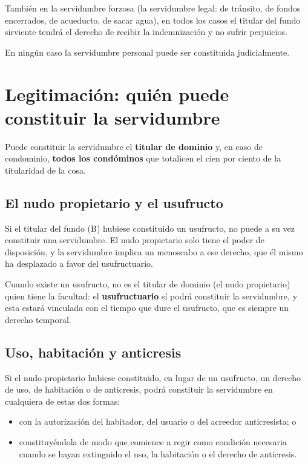 \documentclass[12pt,oneside]{book}
\begin{document}
También en la servidumbre forzosa (la servidumbre legal: de tránsito, de fondos encerrados, de acueducto, de sacar agua), en todos los casos el titular del fundo sirviente tendrá el derecho de recibir la indemnización y no sufrir perjuicios.

\begin{important}
En ningún caso la servidumbre personal puede ser constituida judicialmente.
\end{important}

\section{Legitimación: quién puede constituir la servidumbre}

Puede constituir la servidumbre el \textbf{titular de dominio} y, en caso de condominio, \textbf{todos los condóminos} que totalicen el cien por ciento de la titularidad de la cosa.

\subsection{El nudo propietario y el usufructo}

Si el titular del fundo (B) hubiese constituido un usufructo, no puede a su vez constituir una servidumbre. El nudo propietario solo tiene el poder de disposición, y la servidumbre implica un menoscabo a ese derecho, que él mismo ha desplazado a favor del usufructuario.

Cuando existe un usufructo, no es el titular de dominio (el nudo propietario) quien tiene la facultad: el \textbf{usufructuario} sí podrá constituir la servidumbre, y esta estará vinculada con el tiempo que dure el usufructo, que es siempre un derecho temporal.

\subsection{Uso, habitación y anticresis}

Si el nudo propietario hubiese constituido, en lugar de un usufructo, un derecho de uso, de habitación o de anticresis, podrá constituir la servidumbre en cualquiera de estas dos formas:
\begin{itemize}
    \item con la autorización del habitador, del usuario o del acreedor anticresista; o
    \item constituyéndola de modo que comience a regir como condición necesaria cuando se hayan extinguido el uso, la habitación o el derecho de anticresis.
\end{itemize}
\end{document}
